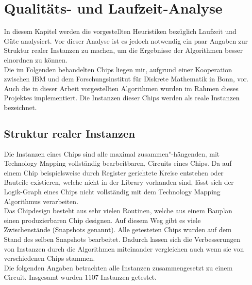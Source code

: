 \documentclass[11pt, a4paper, german]{article}
\newcommand{\TM}{Technology  Mapping }
\begin{document}
\section{Qualitäts- und Laufzeit-Analyse}
\label{sec:analyse}
In diesem Kapitel werden die vorgestellten Heuristiken bezüglich Laufzeit und Güte analysiert. Vor dieser Analyse ist es jedoch notwendig ein paar Angaben zur Struktur realer Instanzen zu machen, um die Ergebnisse der Algorithmen besser einordnen zu können.\\

Die im Folgenden behandelten Chips liegen mir, aufgrund einer Kooperation zwischen IBM und dem Forschungsinstitut für Diskrete Mathematik in Bonn, vor. Auch die in dieser Arbeit vorgestellten Algorithmen wurden im Rahmen dieses Projektes implementiert. Die Instanzen dieser Chips werden als reale Instanzen bezeichnet.

 \subsection{Struktur realer Instanzen}
\label{subsec:struktur_realer_instanzen} 
Die Instanzen eines Chips sind alle maximal zusammen"-h\"angen\-den, mit \TM vollständig bearbeitbaren, Circuits eines Chips. Da auf einem Chip beispielsweise durch Register gerichtete Kreise entstehen oder Bauteile existieren, welche nicht in der Library vorhanden sind, lässt sich der Logik-Graph eines Chips nicht vollständig mit dem \TM Algorithmus verarbeiten. \\
 Das Chipdesign besteht aus sehr vielen Routinen, welche aus einem Bauplan einen produzierbaren Chip designen. Auf diesem Weg gibt es viele Zwischenstände (Snapshots genannt). Alle getesteten Chips wurden auf dem Stand  des selben Snapshots bearbeitet. Dadurch lassen sich die Verbesserungen von Instanzen durch die Algorithmen miteinander vergleichen auch wenn sie von verschiedenen Chips stammen.\\
 Die folgenden Angaben betrachten alle Instanzen zusammengesetzt zu einem Circuit.
 Insgesamt wurden $1107$ Instanzen getestet. \\
\end{document}
